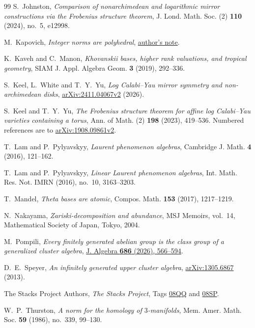 \documentclass[11pt,reqno]{amsart}
\numberwithin{equation}{section}
\theoremstyle{definition}
\theoremstyle{remark}
\begin{document}
\begin{thebibliography}{99}
S.~Johnston, \emph{Comparison of nonarchimedean and logarithmic mirror
constructions via the Frobenius structure theorem},
J. Lond. Math. Soc. (2) \textbf{110} (2024), no.~5, e12998.

M.~Kapovich, \emph{Integer norms are polyhedral},
\href{https://www.math.ucdavis.edu/~kapovich/EPR/norms.pdf}{author's note}.

K.~Kaveh and C.~Manon, \emph{Khovanskii bases, higher rank
valuations, and tropical geometry}, SIAM J. Appl. Algebra Geom.
\textbf{3} (2019), 292--336.

S.~Keel, L.~White and T.~Y.~Yu,
\emph{Log Calabi--Yau mirror symmetry and non-archimedean disks},
\href{https://arxiv.org/abs/2411.04067v2}{arXiv:2411.04067v2} (2026).

S.~Keel and T.~Y.~Yu,
\emph{The Frobenius structure theorem for affine log Calabi--Yau varieties containing a torus},
Ann. of Math. (2) \textbf{198} (2023), 419--536.
Numbered references are to \href{https://arxiv.org/abs/1908.09861v2}{arXiv:1908.09861v2}.

T.~Lam and P.~Pylyavskyy, \emph{Laurent phenomenon algebras},
Cambridge J. Math. \textbf{4} (2016), 121--162.

T.~Lam and P.~Pylyavskyy, \emph{Linear Laurent phenomenon algebras},
Int. Math. Res. Not. IMRN (2016), no.~10, 3163--3203.

T.~Mandel, \emph{Theta bases are atomic},
Compos. Math. \textbf{153} (2017), 1217--1219.

N.~Nakayama, \emph{Zariski-decomposition and abundance},
MSJ Memoirs, vol.~14, Mathematical Society of Japan, Tokyo, 2004.

M.~Pompili, \emph{Every finitely generated abelian group is the class group of a generalized cluster algebra},
\href{https://doi.org/10.1016/j.jalgebra.2025.08.017}{J. Algebra \textbf{686} (2026), 566--594}.

D.~E.~Speyer, \emph{An infinitely generated upper cluster algebra},
\href{https://arxiv.org/abs/1305.6867}{arXiv:1305.6867} (2013).

The Stacks Project Authors, \emph{The Stacks Project},
Tags \href{https://stacks.math.columbia.edu/tag/08QQ}{08QQ}
and \href{https://stacks.math.columbia.edu/tag/08SP}{08SP}.

W.~P.~Thurston, \emph{A norm for the homology of \(3\)-manifolds},
Mem. Amer. Math. Soc. \textbf{59} (1986), no.~339, 99--130.
\end{thebibliography}
\end{document}
